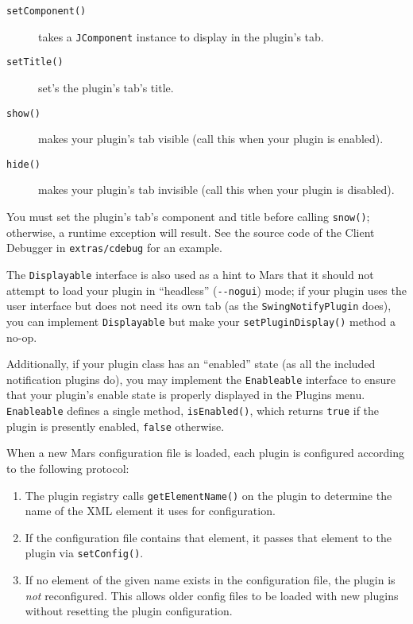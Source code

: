 \documentclass{article}
\newcommand{\filename}[1]{{\tt #1}}
\newcommand{\identifier}[1]{{\tt #1}}
\newcommand{\guiitem}[1]{{\sf #1}}
\begin{document}
\begin{description}
\item[\identifier{setComponent()}] takes a \identifier{JComponent}
  instance to display in the plugin's tab.
\item[\identifier{setTitle()}] set's the plugin's tab's title.
\item[\identifier{show()}] makes your plugin's tab visible (call this
  when your plugin is enabled).
\item[\identifier{hide()}] makes your plugin's tab invisible (call this
  when your plugin is disabled).
\end{description}

You must set the plugin's tab's component and title before calling
\identifier{snow()}; otherwise, a runtime exception will result.  See
the source code of the Client Debugger in \filename{extras/cdebug} for
an example.

The \identifier{Displayable} interface is also used as a hint to Mars
that it should not attempt to load your plugin in ``headless''
(\identifier{\mbox{-}\mbox{-}nogui}) mode; if your plugin uses the
user interface but does not need its own tab (as the
\identifier{SwingNotifyPlugin} does), you can implement
\identifier{Displayable} but make your \identifier{setPluginDisplay()}
method a no-op.

Additionally, if your plugin class has an ``enabled'' state (as all
the included notification plugins do), you may implement the
\identifier{Enableable} interface to ensure that your plugin's enable
state is properly displayed in the \guiitem{Plugins}
menu. \identifier{Enableable} defines a single method,
\identifier{isEnabled()}, which returns \identifier{true} if the
plugin is presently enabled, \identifier{false} otherwise.

When a new Mars configuration file is loaded, each plugin is configured
according to the following protocol:

\begin{enumerate}
\item The plugin registry calls \identifier{getElementName()} on the
  plugin to determine the name of the XML element it uses for
  configuration.
\item If the configuration file contains that element, it passes that
  element to the plugin via \identifier{setConfig()}.
\item If no element of the given name exists in the configuration
  file, the plugin is {\em not} reconfigured. This allows older config
  files to be loaded with new plugins without resetting the plugin
  configuration.
\end{enumerate}
\end{document}
